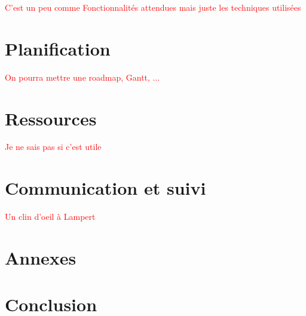 \documentclass{article}
\begin{document}
\textcolor{red}{C'est un peu comme Fonctionnalités attendues mais juste les techniques utilisées}

\section{Planification}

\textcolor{red}{On pourra mettre une roadmap, Gantt, ...}

\section{Ressources}

\textcolor{red}{Je ne sais pas si c'est utile}

\section{Communication et suivi}
\textcolor{red}{Un clin d'oeil à Lampert}

\section{Annexes}

\section{Conclusion}
\end{document}
